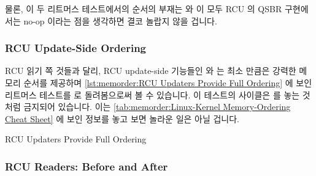 물론, 이 두 리트머스 테스트에서의 순서의 부재는  와
 이 모두 RCU 의 QSBR 구현에서는 no-op 이라는 점을
생각하면 결코 놀랍지 않을 겁니다.

\subsubsection{RCU Update-Side Ordering}
\label{sec:memorder:RCU Update-Side Ordering}

RCU 읽기 쪽 것들과 달리, RCU update-side 기능들인  와
 는 최소  만큼은 강력한 메모리
순서를 제공하며
\cref{lst:memorder:RCU Updaters Provide Full Ordering} 에 보인 리트머스
테스트를  로 돌려봄으로써 볼 수 있습니다.
이 테스트의 사이클은  를 놓는 것처럼 금지되어 있습니다.
이는
\cref{tab:memorder:Linux-Kernel Memory-Ordering Cheat Sheet} 에 보인 정보를
놓고 보면 놀라운 일은 아닐 겁니다.

\begin{listing}[tbp]

\caption{RCU Updaters Provide Full Ordering}
\label{lst:memorder:RCU Updaters Provide Full Ordering}
\end{listing}

\subsubsection{RCU Readers: Before and After}
\label{sec:memorder:RCU Readers: Before and After}

